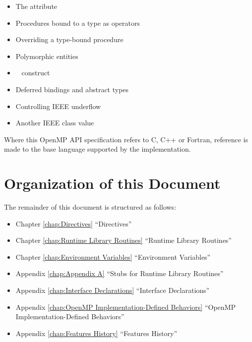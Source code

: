 \begin{itemize}
\begin{itemize}
\item The  attribute

\item Procedures bound to a type as operators

\item Overriding a type-bound procedure

\item Polymorphic entities

\item {}~ construct

\item Deferred bindings and abstract types

\item Controlling IEEE underflow

\item Another IEEE class value 
\end{itemize}
\end{itemize}

Where this OpenMP API specification refers to C, C++ or Fortran, reference is made to 
the base language supported by the implementation.








\pagebreak
\section{Organization of this Document}
\label{sec:Organization of this document}
The remainder of this document is structured as follows: 

\begin{itemize}
\item Chapter \ref{chap:Directives} ``Directives''

\item Chapter \ref{chap:Runtime Library Routines} ``Runtime Library Routines''

\item Chapter \ref{chap:Environment Variables} ``Environment Variables''

\item Appendix \ref{chap:Appendix A} ``Stubs for Runtime Library Routines''

\item Appendix \ref{chap:Interface Declarations} ``Interface Declarations'' 

\item Appendix \ref{chap:OpenMP Implementation-Defined Behaviors} ``OpenMP Implementation-Defined Behaviors''

\item Appendix \ref{chap:Features History} ``Features History''
\end{itemize}

